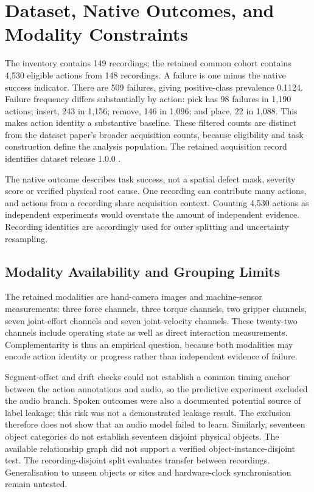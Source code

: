 \section{Dataset, Native Outcomes, and Modality Constraints}
The inventory contains 149 recordings; the retained common cohort contains 4,530
eligible actions from 148 recordings. A failure is one minus the native success
indicator. There are 509 failures, giving positive-class prevalence 0.1124. Failure
frequency differs substantially by action: pick has 98 failures in 1,190 actions;
insert, 243 in 1,156; remove, 146 in 1,096; and place, 22 in 1,088. This makes action
identity a substantive baseline. These filtered counts are distinct from the dataset
paper's broader acquisition counts, because eligibility and task construction define the
analysis population. The retained acquisition record identifies dataset release 1.0.0
\parencite{Sliwowski2025REASSEMBLE,Sliwowski2025REASSEMBLEData}.

The native outcome describes task success, not a spatial defect mask, severity score or
verified physical root cause. One recording can contribute many actions, and actions
from a recording share acquisition context. Counting 4,530 actions as independent
experiments would overstate the amount of independent evidence. Recording identities are
accordingly used for outer splitting and uncertainty resampling.

\subsection{Modality Availability and Grouping Limits}
The retained modalities are hand-camera images and machine-sensor measurements: three
force channels, three torque channels, two gripper channels, seven joint-effort channels
and seven joint-velocity channels. These twenty-two channels include operating state as
well as direct interaction measurements. Complementarity is thus an empirical question,
because both modalities may encode action identity or progress rather than independent
evidence of failure.

Segment-offset and drift checks could not establish a common timing anchor between the
action annotations and audio, so the predictive experiment excluded the audio branch.
Spoken outcomes were also a documented potential source of label leakage; this risk was
not a demonstrated leakage result. The exclusion therefore does not show that an audio
model failed to learn. Similarly, seventeen object categories do not establish
seventeen disjoint physical objects. The available
relationship graph did not support a verified object-instance-disjoint test. The
recording-disjoint split evaluates transfer between recordings. Generalisation to unseen
objects or sites and hardware-clock synchronisation remain untested.

